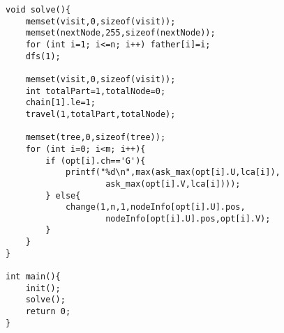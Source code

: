 \begin{verbatim}
void solve(){
    memset(visit,0,sizeof(visit));
    memset(nextNode,255,sizeof(nextNode));
    for (int i=1; i<=n; i++) father[i]=i;
    dfs(1);

    memset(visit,0,sizeof(visit));
    int totalPart=1,totalNode=0;
    chain[1].le=1;
    travel(1,totalPart,totalNode);

    memset(tree,0,sizeof(tree));
    for (int i=0; i<m; i++){
        if (opt[i].ch=='G'){
            printf("%d\n",max(ask_max(opt[i].U,lca[i]),
                    ask_max(opt[i].V,lca[i])));
        } else{
            change(1,n,1,nodeInfo[opt[i].U].pos,
                    nodeInfo[opt[i].U].pos,opt[i].V);
        }
    }
}

int main(){
    init();
    solve();
    return 0;
}
\end{verbatim}
